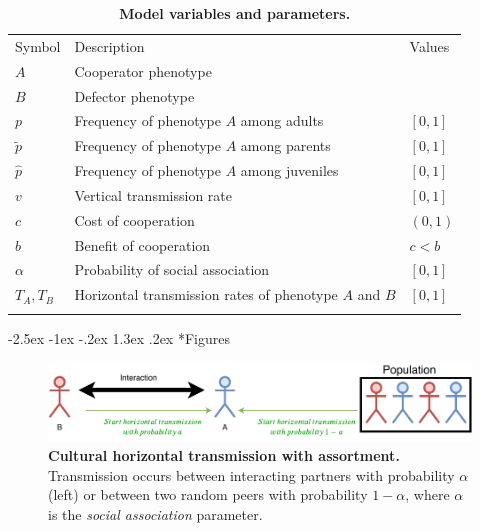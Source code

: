 \documentclass[12pt]{extarticle}
\makeatletter
\renewcommand\section{\@startsection {section}{1}{\z@}%
     {-2.5ex \@plus -1ex \@minus -.2ex}%
     {1.3ex \@plus.2ex}%
    {\Large\bfseries}}
\makeatother
\begin{document}
\bigskip
\begin{table}[h]
\centering
\caption{\textbf{Model variables and parameters.}
}
\begin{tabular}{lll}
\toprule
Symbol & Description & Values \\ \cmidrule(r){1-3}
$A$ & Cooperator phenotype & \\
$B$ & Defector phenotype & \\
$p$ & Frequency of phenotype $A$ among adults & $[0,1]$ \\
$\tilde p$ & Frequency of phenotype $A$ among parents & $[0,1]$ \\
$\hat p$ & Frequency of phenotype $A$ among juveniles & $[0,1]$ \\
$v$ & Vertical transmission rate & $[0,1]$ \\
$c$ & Cost of cooperation & $(0,1)$ \\
$b$ & Benefit of cooperation & $c<b$ \\
$\alpha$ & Probability of social association & $[0,1]$ \\
$T_A, T_B$ & Horizontal transmission rates of phenotype $A$ and $B$ & $[0,1]$ \\
\\ \bottomrule
\end{tabular}
\label{table:vars_params}
\end{table}

\newpage


\section*{Figures}
\begin{figure}[h]
  \centering
  \includegraphics[scale=1]{figure1.pdf}
  \caption{\textbf{Cultural horizontal transmission with assortment.} Transmission occurs between interacting partners with probability $\alpha$ (left) or between two random peers with probability $1-\alpha$, where $\alpha$ is the \emph{social association} parameter.
  }
  \label{fig:horizontal}
\end{figure}
\end{document}
